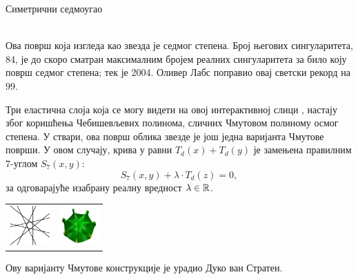 \documentclass[sr]{./../../common/SurferDesc}%
\begin{document}
\footnotesize




\begin{surferPage}
  \begin{surferTitle}Симетрични седмоугао\end{surferTitle}   \\
    Ова површ која изгледа као звезда је седмог степена. Број његових сингуларитета, $84$, 
	је до скоро сматран максималним бројем реалних сингуларитета за било коју површ седмог степена;
    тек је 2004. Оливер Лабс поправио овај светски рекорд на $99$.
  
  
 Три еластична слоја која се могу видети на овој интерактивној слици , 
    настају због коришћења Чебишевљевих полинома, сличних Чмутовом 
    полиному осмог степена. 
    У ствари, ова површ облика звезде је још једна варијанта Чмутове површи.
    У овом случају, крива у равни $T_d(x)+T_d(y)$ је замењена правилним $7$-углом
    $S_7(x,y)$: 
   \[S_7(x,y) + \lambda \cdot T_d(z) = 0,\]
    за одговарајуће изабрану реалну вредност $\lambda\in{\mathbb R}$. 
    \vspace*{-0.3em}
    \begin{center}
      \begin{tabular}{c@{\qquad}c}
        \includegraphics[height=1.5cm]{./../../common/images/labsseptic1.pdf}
        &
        \includegraphics[height=1.5cm]{./../../common/images/septic_7eck_von_oben}
      \end{tabular}
    \end{center}
    \vspace*{-0.3em}   
   Ову варијанту Чмутове конструкције је урадио Дуко ван Стратен. 


  \begin{surferText}
     \end{surferText}
\end{surferPage}
\end{document}
